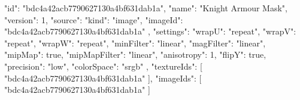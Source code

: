 {
  "id": "bdc4a42acb7790627130a4bf631dab1a",
  "name": "Knight Armour Mask",
  "version": 1,
  "source": {
    "kind": "image",
    "imageId": "bdc4a42acb7790627130a4bf631dab1a"
  },
  "settings": {
    "wrapU": "repeat",
    "wrapV": "repeat",
    "wrapW": "repeat",
    "minFilter": "linear",
    "magFilter": "linear",
    "mipMap": true,
    "mipMapFilter": "linear",
    "anisotropy": 1,
    "flipY": true,
    "precision": "low",
    "colorSpace": "srgb"
  },
  "textureIds": [
    "bdc4a42acb7790627130a4bf631dab1a"
  ],
  "imageIds": [
    "bdc4a42acb7790627130a4bf631dab1a"
  ]
}
